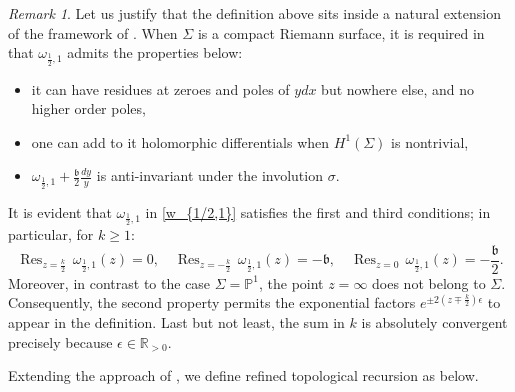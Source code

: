 \documentclass[12pt]{amsart}
\DeclareMathOperator*{\Res}{Res}
\theoremstyle{plain}
\theoremstyle{definition}
\theoremstyle{remark}
\newtheorem{remark}[theorem]{Remark}
\numberwithin{equation}{section}
\begin{document}
\begin{remark}\label{rem:RSC}
Let us justify that the definition above sits inside a natural extension of the framework of \cite{Osu23-1}. When $\Sigma$ is a compact Riemann surface, it is required in \cite{Osu23-1} that $\omega_{\frac12,1}$ admits the properties below:
\begin{itemize}
\item[{RSC1}:] \label{item:RSC1} it can have residues at zeroes and poles of $ydx$ but nowhere else, and no higher order poles,
\item[{RSC2}:] \label{item:RSC2} one can add to it holomorphic differentials when $H^1(\Sigma)$ is nontrivial,
\item[{RSC3}:] \label{item:RSC3}$\omega_{\frac12,1}+\frac{\mathfrak{b}}{2}\frac{dy}{y}$ is anti-invariant under the involution $\sigma$.
\end{itemize}
It is evident that $\omega_{\frac12,1}$ in \eqref{w_{1/2,1}} satisfies the first and third conditions; in particular, for $k\geq1$:
\begin{equation*}
\Res_{z=\frac{k}{2}}\,\omega_{\frac12,1}(z)=0,\quad \Res_{z=-\frac{k}{2}}\,\omega_{\frac12,1}(z)=-\mathfrak{b},\quad \Res_{z=0}\,\omega_{\frac12,1}(z)=-\frac{\mathfrak{b}}{2}.
\end{equation*}
Moreover, in contrast to the case $\Sigma=\mathbb{P}^1$, the point $z=\infty$ does not belong to $\Sigma$. Consequently, the second property permits the exponential factors $e^{\pm2(z\mp\frac{k}{2})\epsilon}$ to appear in the definition. Last but not least, the sum in $k$ is absolutely convergent precisely because $\epsilon\in\mathbb{R}_{>0}$. 
\end{remark}

Extending the approach of \cite{Osu23-1}, we define refined topological recursion as below.
\end{document}
